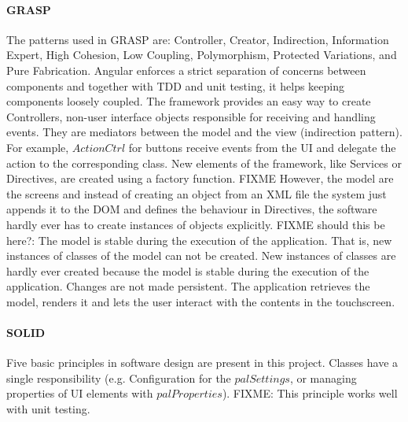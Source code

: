 \paragraph{\ac{GRASP}} The patterns used in \ac{GRASP} are: Controller, Creator, Indirection, Information Expert, High Cohesion, Low Coupling, Polymorphism, Protected Variations, and Pure Fabrication. 
Angular enforces a strict separation of concerns between components and together with \ac{TDD} and unit testing, it helps keeping components loosely coupled.
The framework provides an easy way to create Controllers, non-user interface objects responsible for receiving and handling events.
They are mediators between the model and the view (indirection pattern). 
For example, $ActionCtrl$ for buttons receive events from the \ac{UI} and delegate the action to the corresponding class.
New elements of the framework, like Services or Directives, are created using a factory function.
FIXME However, the model are the screens and instead of creating an object from an \ac{XML} file the system just appends it to the \ac{DOM} and defines the behaviour in Directives, the software hardly ever has to create instances of objects explicitly.
FIXME should this be here?: The model is stable during the execution of the application. That is, new instances of classes of the model can not be created. 
New instances of classes are hardly ever created because the model is stable during the execution of the application. 
Changes are not made persistent. The application retrieves the model, renders it and lets the user interact with the contents in the touchscreen.

\paragraph{\ac{SOLID}} Five basic principles in software design are present in this project.
Classes have a single responsibility (e.g. Configuration for the $palSettings$, or managing properties of \ac{UI} elements with $palProperties$). 
FIXME: This principle works well with unit testing.


